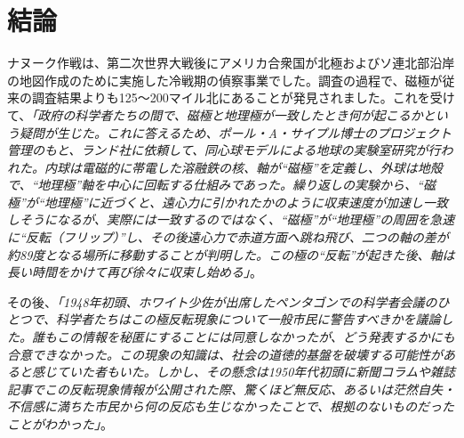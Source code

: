 \documentclass[10pt,twocolumn,letterpaper]{article}
\begin{document}
\section{結論}

ナヌーク作戦は、第二次世界大戦後にアメリカ合衆国が北極およびソ連北部沿岸の地図作成のために実施した冷戦期の偵察事業でした\cite{137}。調査の過程で、磁極が従来の調査結果よりも125〜200マイル北にあることが発見されました。これを受けて、\textit{「政府の科学者たちの間で、磁極と地理極が一致したとき何が起こるかという疑問が生じた。これに答えるため、ポール・A・サイプル博士のプロジェクト管理のもと、ランド社に依頼して、同心球モデルによる地球の実験室研究が行われた。内球は電磁的に帯電した溶融鉄の核、軸が“磁極”を定義し、外球は地殻で、“地理極”軸を中心に回転する仕組みであった。繰り返しの実験から、“磁極”が“地理極”に近づくと、遠心力に引かれたかのように収束速度が加速し一致しそうになるが、実際には一致するのではなく、“磁極”が“地理極”の周囲を急速に“反転（フリップ）”し、その後遠心力で赤道方面へ跳ね飛び、二つの軸の差が約89度となる場所に移動することが判明した。この極の“反転”が起きた後、軸は長い時間をかけて再び徐々に収束し始める」}\cite{138,139}。

その後、\textit{「1948年初頭、ホワイト少佐が出席したペンタゴンでの科学者会議のひとつで、科学者たちはこの極反転現象について一般市民に警告すべきかを議論した。誰もこの情報を秘匿にすることには同意しなかったが、どう発表するかにも合意できなかった。この現象の知識は、社会の道徳的基盤を破壊する可能性があると感じていた者もいた。しかし、その懸念は1950年代初頭に新聞コラムや雑誌記事でこの反転現象情報が公開された際、驚くほど無反応、あるいは茫然自失・不信感に満ちた市民から何の反応も生じなかったことで、根拠のないものだったことがわかった」}\cite{138,139}。
\end{document}
